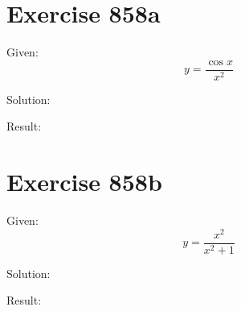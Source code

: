 \documentclass[a4paper, 10pt]{scrartcl}
\begin{document}
\section{Exercise 858a}

Given:
\[
y = \frac{\cos{x}}{x^{2}}
\]

Solution:

Result:

\section{Exercise 858b}

Given:
\[
y = \frac{x^{2}}{x^{2} + 1}
\]

Solution:

Result:
\end{document}
